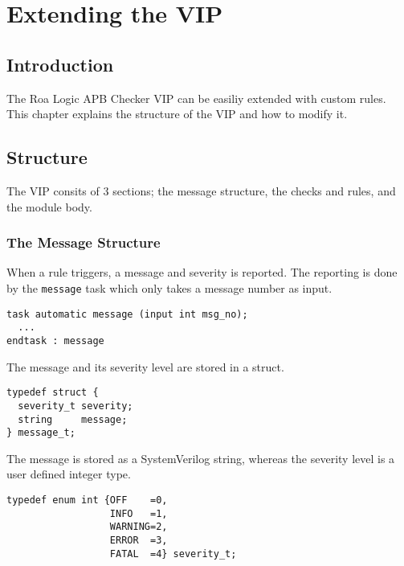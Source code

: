 \chapter{Extending the VIP}\label{extending}

\section{Introduction}

The Roa Logic APB Checker VIP can be easiliy extended with custom rules. This chapter explains the structure of the VIP and how to modify it.

\section{Structure}

The VIP consits of 3 sections; the message structure, the checks and rules, and the module body.


\subsection{The Message Structure}

When a rule triggers, a message and severity is reported.
The reporting is done by the \texttt{message} task which only takes a message number as input.

\lstset{language=verilog,
        basicstyle=\small\ttfamily,
        showstringspaces=false,
        frame=single}
        
\begin{lstlisting}
task automatic message (input int msg_no);
  ...
endtask : message
\end{lstlisting}

\noindent
The message and its severity level are stored in a struct.

\begin{lstlisting}
typedef struct {
  severity_t severity;
  string     message;
} message_t;
\end{lstlisting}

\noindent
The message is stored as a SystemVerilog string, whereas the severity level is a user defined integer type.

\begin{lstlisting}
typedef enum int {OFF    =0,
                  INFO   =1,
                  WARNING=2,
                  ERROR  =3,
                  FATAL  =4} severity_t;
\end{lstlisting}

